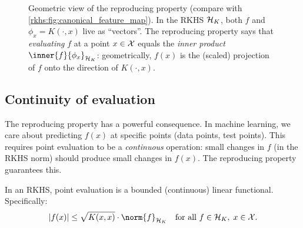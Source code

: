\begin{notechapter}
\begin{figure}[ht]
\caption{Geometric view of the reproducing property
(compare with
\cref{rkhs:fig:canonical_feature_map}).
In the RKHS $\mathcal{H}_K$, both $f$ and
$\phi_x = K(\cdot, x)$ live as ``vectors''. The
reproducing property says that \emph{evaluating} $f$
at a point $x \in \mathcal{X}$ equals the \emph{inner product}
$\inner{f}{\phi_x}_{\hk}$: geometrically, $f(x)$ is
the (scaled\protect\footnotemark) projection of $f$
onto the direction of $K(\cdot, x)$.}
\label{rkhs:fig:reproducing_property}
\end{figure}

\subsection{Continuity of evaluation}

The reproducing property has a powerful consequence.
In machine learning, we care about predicting
$f(x)$ at specific points (data points, test points).
This requires point evaluation to be a
\emph{continuous} operation: small changes in $f$
(in the RKHS norm) should produce small changes in
$f(x)$. The reproducing property guarantees this.

\begin{proposition}
\label{rkhs:prop:eval_continuous}
In an RKHS, point evaluation is a bounded (continuous)
linear functional. Specifically:
\begin{equation}
\label{rkhs:eq:eval_bound}
|f(x)| \leq \sqrt{K(x,x)} \cdot \norm{f}_{\hk}
\quad \text{for all } f \in \hk,\; x \in \X.
\end{equation}
\end{proposition}


\end{notechapter}
